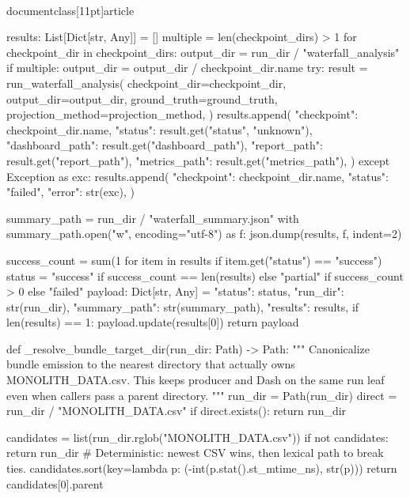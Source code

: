 \\documentclass[11pt]{article}
\begin{document}
\begin{CodeBlock}
    results: List[Dict[str, Any]] = []
    multiple = len(checkpoint_dirs) > 1
    for checkpoint_dir in checkpoint_dirs:
        output_dir = run_dir / "waterfall_analysis"
        if multiple:
            output_dir = output_dir / checkpoint_dir.name
        try:
            result = run_waterfall_analysis(
                checkpoint_dir=checkpoint_dir,
                output_dir=output_dir,
                ground_truth=ground_truth,
                projection_method=projection_method,
            )
            results.append(
                {
                    "checkpoint": checkpoint_dir.name,
                    "status": result.get("status", "unknown"),
                    "dashboard_path": result.get("dashboard_path"),
                    "report_path": result.get("report_path"),
                    "metrics_path": result.get("metrics_path"),
                }
            )
        except Exception as exc:
            results.append(
                {
                    "checkpoint": checkpoint_dir.name,
                    "status": "failed",
                    "error": str(exc),
                }
            )

    summary_path = run_dir / "waterfall_summary.json"
    with summary_path.open("w", encoding="utf-8") as f:
        json.dump(results, f, indent=2)

    success_count = sum(1 for item in results if item.get("status") == "success")
    status = "success" if success_count == len(results) else "partial" if success_count > 0 else "failed"
    payload: Dict[str, Any] = {
        "status": status,
        "run_dir": str(run_dir),
        "summary_path": str(summary_path),
        "results": results,
    }
    if len(results) == 1:
        payload.update(results[0])
    return payload


def _resolve_bundle_target_dir(run_dir: Path) -> Path:
    """
    Canonicalize bundle emission to the nearest directory that actually owns MONOLITH_DATA.csv.
    This keeps producer and Dash on the same run leaf even when callers pass a parent directory.
    """
    run_dir = Path(run_dir)
    direct = run_dir / "MONOLITH_DATA.csv"
    if direct.exists():
        return run_dir

    candidates = list(run_dir.rglob("MONOLITH_DATA.csv"))
    if not candidates:
        return run_dir
    # Deterministic: newest CSV wins, then lexical path to break ties.
    candidates.sort(key=lambda p: (-int(p.stat().st_mtime_ns), str(p)))
    return candidates[0].parent



\end{CodeBlock}
\end{document}
